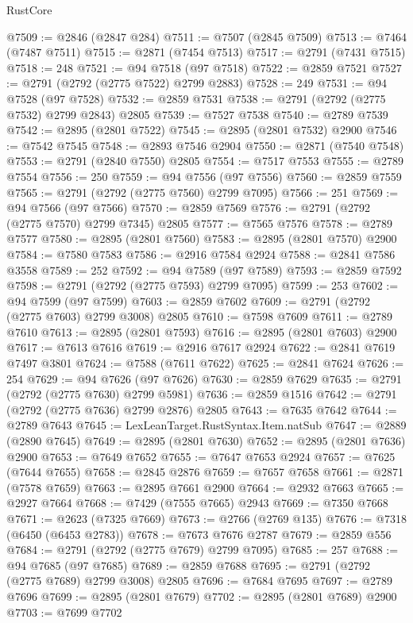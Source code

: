 \begin{lexlean}{RustCore}
\begin{coremodule}
@7509 := @2846 (@2847 @284)
@7511 := @7507 (@2845 @7509)
@7513 := @7464 (@7487 @7511)
@7515 := @2871 (@7454 @7513)
@7517 := @2791 (@7431 @7515)
@7518 := 248
@7521 := @94 @7518 (@97 @7518)
@7522 := @2859 @7521
@7527 := @2791 (@2792 (@2775 @7522) @2799 @2883)
@7528 := 249
@7531 := @94 @7528 (@97 @7528)
@7532 := @2859 @7531
@7538 := @2791 (@2792 (@2775 @7532) @2799 @2843) @2805
@7539 := @7527 @7538
@7540 := @2789 @7539
@7542 := @2895 (@2801 @7522)
@7545 := @2895 (@2801 @7532) @2900
@7546 := @7542 @7545
@7548 := @2893 @7546 @2904
@7550 := @2871 (@7540 @7548)
@7553 := @2791 (@2840 @7550) @2805
@7554 := @7517 @7553
@7555 := @2789 @7554
@7556 := 250
@7559 := @94 @7556 (@97 @7556)
@7560 := @2859 @7559
@7565 := @2791 (@2792 (@2775 @7560) @2799 @7095)
@7566 := 251
@7569 := @94 @7566 (@97 @7566)
@7570 := @2859 @7569
@7576 := @2791 (@2792 (@2775 @7570) @2799 @7345) @2805
@7577 := @7565 @7576
@7578 := @2789 @7577
@7580 := @2895 (@2801 @7560)
@7583 := @2895 (@2801 @7570) @2900
@7584 := @7580 @7583
@7586 := @2916 @7584 @2924
@7588 := @2841 @7586 @3558
@7589 := 252
@7592 := @94 @7589 (@97 @7589)
@7593 := @2859 @7592
@7598 := @2791 (@2792 (@2775 @7593) @2799 @7095)
@7599 := 253
@7602 := @94 @7599 (@97 @7599)
@7603 := @2859 @7602
@7609 := @2791 (@2792 (@2775 @7603) @2799 @3008) @2805
@7610 := @7598 @7609
@7611 := @2789 @7610
@7613 := @2895 (@2801 @7593)
@7616 := @2895 (@2801 @7603) @2900
@7617 := @7613 @7616
@7619 := @2916 @7617 @2924
@7622 := @2841 @7619 @7497 @3801
@7624 := @7588 (@7611 @7622)
@7625 := @2841 @7624
@7626 := 254
@7629 := @94 @7626 (@97 @7626)
@7630 := @2859 @7629
@7635 := @2791 (@2792 (@2775 @7630) @2799 @5981)
@7636 := @2859 @1516
@7642 := @2791 (@2792 (@2775 @7636) @2799 @2876) @2805
@7643 := @7635 @7642
@7644 := @2789 @7643
@7645 := LexLeanTarget.RustSyntax.Item.natSub
@7647 := @2889 (@2890 @7645)
@7649 := @2895 (@2801 @7630)
@7652 := @2895 (@2801 @7636) @2900
@7653 := @7649 @7652
@7655 := @7647 @7653 @2924
@7657 := @7625 (@7644 @7655)
@7658 := @2845 @2876
@7659 := @7657 @7658
@7661 := @2871 (@7578 @7659)
@7663 := @2895 @7661 @2900
@7664 := @2932 @7663
@7665 := @2927 @7664
@7668 := @7429 (@7555 @7665) @2943
@7669 := @7350 @7668
@7671 := @2623 (@7325 @7669)
@7673 := @2766 (@2769 @135)
@7676 := @7318 (@6450 (@6453 @2783))
@7678 := @7673 @7676 @2787
@7679 := @2859 @556
@7684 := @2791 (@2792 (@2775 @7679) @2799 @7095)
@7685 := 257
@7688 := @94 @7685 (@97 @7685)
@7689 := @2859 @7688
@7695 := @2791 (@2792 (@2775 @7689) @2799 @3008) @2805
@7696 := @7684 @7695
@7697 := @2789 @7696
@7699 := @2895 (@2801 @7679)
@7702 := @2895 (@2801 @7689) @2900
@7703 := @7699 @7702

\end{coremodule}
\end{lexlean}
